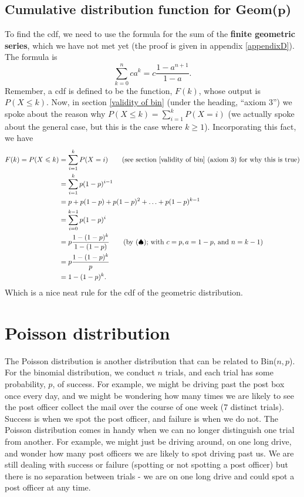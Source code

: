 \subsection{Cumulative distribution function for Geom($\boldsymbol{p}$)} \label{geom cdf} \label{finite geometric series}
To find the cdf, we need to use the formula for the sum of the \textbf{finite geometric series}, which we have not met yet (the proof is given in appendix \ref{appendixD}). The formula is
\[
\sum_{k=0}^n ca^k = c\frac{1-a^{n+1}}{1-a}. \tag{$\spadesuit$}
\]
Remember, a cdf is defined to be the function, $F(k)$, whose output is $P(X \leq k)$. Now, in section \ref{validity of bin} (under the heading, ``axiom 3'') we spoke about the reason why $P(X \leq k) = \sum_{i = 1}^k P(X = i)$ (we actually spoke about the general case, but this is the case where $k \geq 1$). Incorporating this fact, we have
\begin{align*}
F(k) = P(X \leq k) & = \sum_{i = 1}^k P(X = i) \tag{see section \ref{validity of bin} (axiom 3) for why this is true} \\
	& = \sum_{i = 1}^k p(1-p)^{i-1} \\
	& = p + p(1-p) + p(1-p)^2 + \ldots + p(1-p)^{k-1} \\
	& = \sum_{i = 0}^{k-1} p(1-p)^i \\
	& = p\frac{1-(1-p)^k}{1-(1-p)} \tag{by ($\spadesuit$); with $c = p, a = 1-p,$ and $n = k - 1$} \\
	& = p\frac{1-(1-p)^k}{p} \\
	& = 1-(1-p)^k.
\end{align*}
Which is a nice neat rule for the cdf of the geometric distribution.

\section{Poisson distribution}
The Poisson distribution is another distribution that can be related to Bin($n,p$). For the binomial distribution, we conduct $n$ trials, and each trial has some probability, $p$, of success. For example, we might be driving past the post box once every day, and we might be wondering how many times we are likely to see the post officer collect the mail over the course of one week (7 distinct trials). Success is when we spot the post officer, and failure is when we do not. The Poisson distribution comes in handy when we can no longer distinguish one trial from another. For example, we might just be driving around, on one long drive, and wonder how many post officers we are likely to spot driving past us. We are still dealing with success or failure (spotting or not spotting a post officer) but there is no separation between trials - we are on one long drive and could spot a post officer at any time. \\

